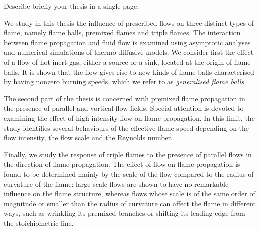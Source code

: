 Describe briefly your thesis in a single page.  

We study in this thesis the influence of prescribed flows on three distinct types of flame, namely flame balls, premixed flames and triple flames. The interaction between flame propagation and fluid flow is examined using asymptotic analyses and numerical simulations of thermo-diffusive models. We consider first the effect of a flow of hot inert gas, either a source or a sink, located at the origin of flame balls. It is shown that the flow gives rise to new kinds of flame balls characterised by having nonzero burning speeds, which we refer to as {\em generalised flame balls}. 

The second part of the thesis is concerned with premixed flame propagation in the presence of parallel and vortical flow fields. Special attention is devoted to examining the effect of high-intensity flow on flame propagation. In this limit, the study identifies several behaviours of the effective flame speed depending on the flow intensity, the flow scale and the Reynolds number. 

Finally, we study the response of triple flames to the presence of parallel flows in the direction of flame propagation. The effect of flow on flame propagation is found to be determined mainly by the scale of the flow compared to the radius of curvature of the flame: large scale flows are shown to have no remarkable influence on the flame structure, whereas flows whose scale is of the same order of magnitude or smaller than the radius of curvature can affect the flame in different ways, such as wrinkling its premixed branches or shifting its leading edge from the stoichiometric line. 